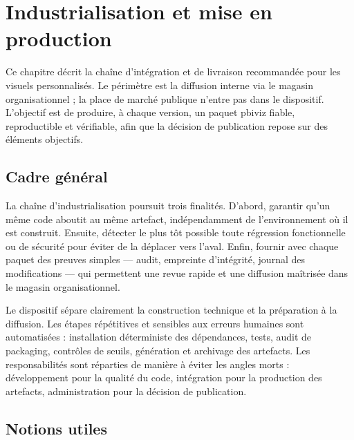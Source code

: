 
\chapter{Industrialisation et mise en production}
\label{chap:industrialisation}

Ce chapitre décrit la chaîne d’intégration et de livraison recommandée pour les visuels personnalisés. Le périmètre est la diffusion interne via le magasin organisationnel ; la place de marché publique n’entre pas dans le dispositif. L’objectif est de produire, à chaque version, un paquet pbiviz fiable, reproductible et vérifiable, afin que la décision de publication repose sur des éléments objectifs.

\section{Cadre général}
\label{sec:ci-cadre}

La chaîne d’industrialisation poursuit trois finalités. D’abord, garantir qu’un même code aboutit au même artefact, indépendamment de l’environnement où il est construit. Ensuite, détecter le plus tôt possible toute régression fonctionnelle ou de sécurité pour éviter de la déplacer vers l’aval. Enfin, fournir avec chaque paquet des preuves simples — audit, empreinte d’intégrité, journal des modifications — qui permettent une revue rapide et une diffusion maîtrisée dans le magasin organisationnel.

Le dispositif sépare clairement la construction technique et la préparation à la diffusion. Les étapes répétitives et sensibles aux erreurs humaines sont automatisées : installation déterministe des dépendances, tests, audit de packaging, contrôles de seuils, génération et archivage des artefacts. Les responsabilités sont réparties de manière à éviter les angles morts : développement pour la qualité du code, intégration pour la production des artefacts, administration pour la décision de publication.

\section{Notions utiles}
\label{sec:definitions}

